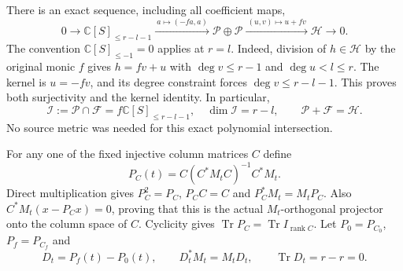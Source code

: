 \documentclass[11pt,a4paper]{article}
\begin{document}
There is an exact sequence, including all coefficient maps,
\[
 0\longrightarrow\mathbb C[S]_{\leq r-l-1}
 \xrightarrow{\ a\mapsto(-fa,a)\ }
 \mathcal P\oplus\mathcal P
 \xrightarrow{\ (u,v)\mapsto u+fv\ }
 \mathcal H\longrightarrow0.
 \tag{CTR4}
\]
The convention $\mathbb C[S]_{\leq-1}=0$ applies at $r=l$.
Indeed, division of $h\in\mathcal H$ by the original monic $f$ gives
$h=fv+u$ with $\deg v\leq r-1$ and $\deg u<l\leq r$. The kernel is
$u=-fv$, and its degree constraint forces $\deg v\leq r-l-1$.
This proves both surjectivity and the kernel identity. In particular,
\[
 \mathcal I:=\mathcal P\cap\mathcal F
       =f\mathbb C[S]_{\leq r-l-1},\quad
 \dim\mathcal I=r-l,\qquad \mathcal P+\mathcal F=\mathcal H.
 \tag{CTR5}
\]
No source metric was needed for this exact polynomial intersection.

For any one of the fixed injective column matrices $C$ define
\[
 P_C(t)=C(C^*M_tC)^{-1}C^*M_t.
 \tag{CTR6}
\]
Direct multiplication gives $P_C^2=P_C$, $P_CC=C$ and
$P_C^*M_t=M_tP_C$. Also $C^*M_t(x-P_Cx)=0$, proving that this is the
actual $M_t$-orthogonal projector onto the column space of $C$.
Cyclicity gives $\operatorname{Tr}P_C=\operatorname{Tr}I_{\operatorname{rank}C}$.
Let $P_0=P_{C_0}$, $P_f=P_{C_f}$ and
\[
 D_t=P_f(t)-P_0(t),\qquad
 D_t^*M_t=M_tD_t,\qquad \operatorname{Tr}D_t=r-r=0.
 \tag{CTR7}
\]
\end{document}
